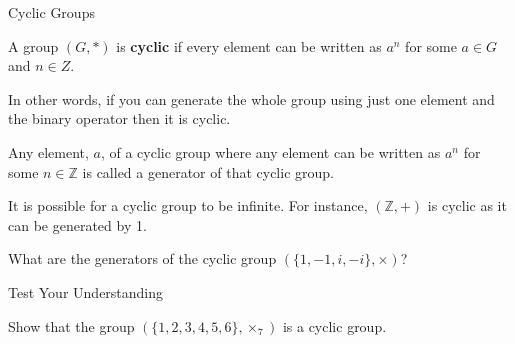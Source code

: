 \documentclass[8pt]{beamer}
\begin{document}
\begin{frame}{Cyclic Groups}
	\begin{definition}
		A group $(G,*)$ is  \textbf{cyclic} if every element can be written as $a^n$ for some  $a\in G$ and  $n \in Z$. 
		
	\end{definition}
	In other words, if you can generate the whole group using just one element and the binary operator then it is cyclic.

	\begin{definition}
		Any element, $a$, of a cyclic group where any element can be written as $a^n$ for some  $n\in \mathbb{Z}$ is called a generator of that cyclic group.

		
	\end{definition}
	
	It is possible for a cyclic group to be infinite. For instance, $(\mathbb{Z},+)$ is cyclic as it can be generated by 1.

	 \begin{Problem}
		 What are the generators of the cyclic group $(\{1,-1,i,-i\},\times)$?
		
	\end{Problem}
\end{frame}

\begin{frame}{Test Your Understanding}
	\begin{Problem}
		Show that the group $(\{1,2,3,4,5,6\},\times_7)$ is a cyclic group.
	\end{Problem}

\end{frame}
\end{document}
